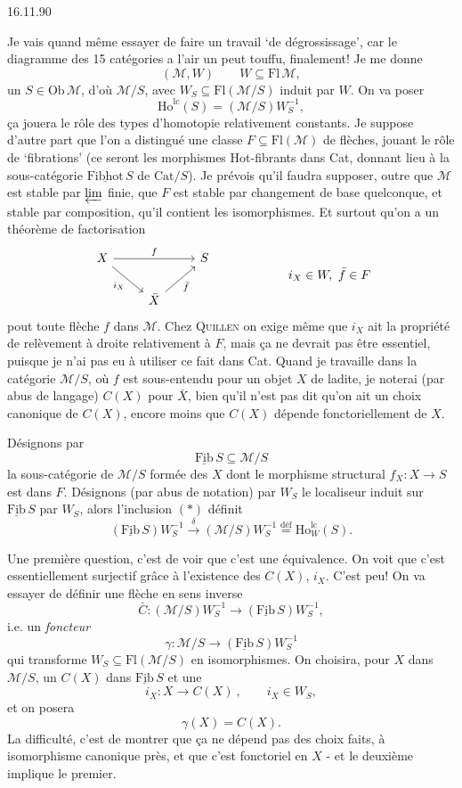 \documentclass[11pt]{article}
\newcommand{\printedpage}[1]{\marginpar{\footnotesize p.~#1}}
\newcommand{\msp}[1]{\marginpar{\footnotesize [#1]}}
\newcommand{\Ob}{\mathrm{Ob}}
\newcommand{\Fl}{\mathrm{Fl}}
\newcommand{\cM}{\mathcal{M}}
\newcommand{\Fib}{\underline{\mathrm{Fib}}\,}
\newcommand{\Fibhot}{\underline{\mathrm{Fibhot}}\,}
\newcommand{\Ho}{\mathrm{Ho}}
\begin{document}
\printedpage{54}

\begin{flushright}
16.11.90
\end{flushright}

Je vais quand même essayer de faire un travail ‘de dégrossissage’, car le diagramme des
15 catégories a l'air un peut touffu, %
finalement! Je me donne
\[
(\cM,W) \qquad W\subseteq \Fl\,\cM,
\]
un $S\in\Ob\,\cM$, d'où $\cM/S$, avec $W_S\subseteq\Fl(\cM/S)$ induit par $W$. On va poser
\[
\Ho^{\mathrm{lc}}(S)=(\cM/S)W_S^{-1},
\]
ça jouera le rôle des types d'homotopie relativement constants. Je suppose d'autre part
que l'on a distingué une classe $F\subseteq\Fl(\cM)$ de flèches, jouant le rôle de ‘fibrations’ (ce
seront les morphismes Hot-fibrants dans Cat, donnant lieu à la sous-catégorie $\Fibhot S$
de $\mathrm{Cat}/S$). Je prévois qu'il faudra
\msp{page 86}supposer, outre que $\cM$ est stable par $\varprojlim$ finie, que $F$ est stable par changement de base
quelconque, et stable par composition, qu'il contient les isomorphismes. Et surtout qu'on
a un théorème de factorisation
\[
\begin{tikzcd}
X \arrow[rr, "f"] \arrow[dr, "i_X"'] & & S \\
& \bar{X} \arrow[ur, "\bar{f}"'] &
\end{tikzcd}
\qquad\qquad\qquad
i_X\in W,\ \bar{f}\in F
\]
pout %
toute flèche $f$ dans $\cM$. Chez \textsc{Quillen} on exige même que $i_X$ ait la propriété de
relèvement à droite relativement à $F$, mais ça ne devrait pas être essentiel, puisque je n'ai
pas eu à utiliser ce fait dans Cat. Quand je travaille dans la catégorie $\cM/S$, où $f$ est
sous-entendu pour un objet $X$ de ladite, je noterai (par abus de langage) $C(X)$ pour $\bar{X}$,
bien qu'il n'est pas dit qu'on ait un choix canonique de $C(X)$, encore moins que $C(X)$
dépende fonctoriellement de $X$.

Désignons par
\[
\Fib S\subseteq\cM/S \tag*{$(*)$}
\]
la sous-catégorie de $\cM/S$ formée des $X$ dont le morphisme structural $f_X:X\longrightarrow S$ est
dans $F$. Désignons (par abus de notation) par $W_S$ le localiseur induit sur $\Fib S$ par $W_S$,
alors l'inclusion $(*)$ définit
\[
(\Fib S)W_S^{-1}\xrightarrow{\ \delta\ }(\cM/S)W_S^{-1}\overset{\text{déf}}{=}\Ho^{\mathrm{lc}}_W(S).
\]

\msp{page 87}Une première question, c'est de voir que c'est une équivalence. On voit que c'est essentiellement
surjectif grâce à l'existence des $C(X)$, $i_X$. C'est peu! On va essayer de définir
une flèche en sens inverse
\[
\bar{C}:(\cM/S)W_S^{-1}\longrightarrow(\Fib S)W_S^{-1},
\]
\printedpage{55}
i.e. un \textit{foncteur}
\[
\gamma:\cM/S\longrightarrow(\Fib S)W_S^{-1}
\]
qui transforme $W_S\subseteq\Fl(\cM/S)$ en isomorphismes. On choisira, pour $X$ dans $\cM/S$, un
$C(X)$ dans $\Fib S$ et une
\[
i_X:X\longrightarrow C(X)\ , \qquad i_X\in W_S,
\]
et on posera
\[
\gamma(X)=C(X).
\]
La difficulté, c'est de montrer que ça ne dépend pas des choix faits, à isomorphisme
canonique près, et que c'est fonctoriel en $X$ - et le deuxième implique le premier.
\end{document}
